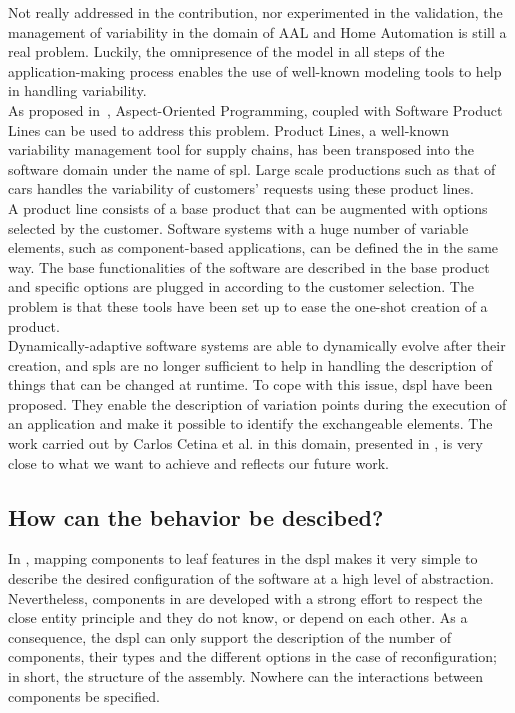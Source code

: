 Not really addressed in the contribution, nor experimented in the validation, the management of variability in the domain of AAL and Home Automation is still a real problem. Luckily, the omnipresence of the model in all steps of the application-making process enables the use of well-known modeling tools to help in handling variability.\\

As proposed in~\cite{Morin:2010}, Aspect-Oriented Programming, coupled with Software Product Lines can be used to address this problem. Product Lines, a well-known variability management tool for supply chains, has been transposed into the software domain under the name of \gls{spl}. Large scale productions such as that of cars handles the variability of customers' requests using these product lines.\\
A product line consists of a base product that can be augmented with options selected by the customer. Software systems with a huge number of variable elements, such as component-based applications, can be defined the in the same way. The base functionalities of the software are described in the base product and specific options are plugged in according to the customer selection. The problem is that these tools have been set up to ease the one-shot creation of a product.\\

Dynamically-adaptive software systems are able to dynamically evolve after their creation, and \gls{spl}s are no longer sufficient to help in handling the description of things that can be changed at runtime. To cope with this issue, \gls{dspl} have been proposed. They enable the description of variation points during the execution of an application and make it possible to identify the exchangeable elements. The work carried out by Carlos Cetina et al. in this domain, presented in \cite{Cetina:2009}, is very close to what we want to achieve and reflects our future work.\\


\subsection{How can the behavior be descibed?}

In \enti{}, mapping components to leaf features in the \gls{dspl} makes it very simple to describe the desired configuration of the software at a high level of abstraction. Nevertheless, components in \enti{} are developed with a strong effort to respect the close entity principle and they do not know, or depend on each other. As a consequence, the \gls{dspl} can only support the description of the number of components, their types and the different options in the case of reconfiguration; in short, the structure of the assembly. Nowhere can the interactions between components be specified.\\

